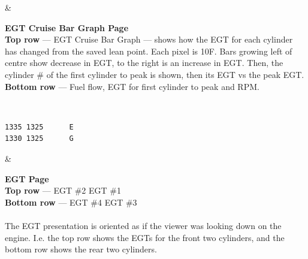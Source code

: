 \begin{longtable}
\begin{minipage}{\eistableleftcol}
\setlength{\unitlength}{1.31pt}
\end{minipage}&
\begin{minipage}{\eistablerightcol}
\vspace{\tabletopspace}
\textbf{EGT Cruise Bar Graph Page}\\
\textbf{Top row} --- EGT Cruise Bar Graph --- shows how the EGT for each cylinder has changed from the saved lean point. 
Each pixel is 10\textdegree F.  Bars growing left of centre show decrease in EGT, to the right is an increase in EGT.  
Then, the cylinder \# of the first cylinder to peak is shown, then its EGT vs the peak EGT.\\
\textbf{Bottom row} --- Fuel flow, EGT for first cylinder to peak and RPM.
\vspace{\tablebottomspace}
\end{minipage}\\
\hline

\begin{minipage}{\eistableleftcol}\ttfamily 
  \begin{verbatim}1335 1325      E
1330 1325      G\end{verbatim}
\end{minipage}&
\begin{minipage}{\eistablerightcol}
\vspace{\tabletopspace}
\textbf{EGT Page }\\
\textbf{Top row} --- EGT \#2 EGT \#1\\
\textbf{Bottom row} ---  EGT \#4 EGT \#3\\\\
The EGT presentation is oriented as if the viewer was looking down on the engine.  I.e. the top row shows the EGTs for
the front two cylinders, and the bottom row shows the rear two cylinders.
\vspace{\tablebottomspace}
\end{minipage}\\
\hline


\end{longtable}

